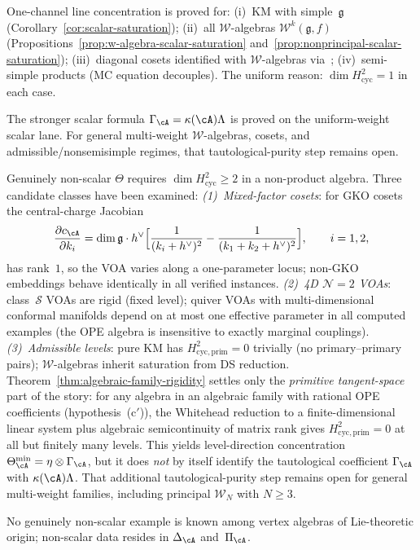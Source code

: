 \begin{remark}
\label{rem:scalar-saturation-scope}
One-channel line concentration is proved for:
(i)~KM with simple~$\mathfrak{g}$ (Corollary~\ref{cor:scalar-saturation});
(ii)~all $\mathcal{W}$-algebras $\mathcal{W}^k(\mathfrak{g},f)$
(Propositions~\ref{prop:w-algebra-scalar-saturation}
and~\ref{prop:nonprincipal-scalar-saturation});
(iii)~diagonal cosets identified with $\mathcal{W}$-algebras via~\cite{ACL19};
(iv)~semi-simple products (MC equation decouples).
The uniform reason: $\dim H^2_{\mathrm{cyc}} = 1$ in each case.

The stronger scalar formula
$\Gamma_{\cA} = \kappa(\cA)\Lambda$ is proved on the
uniform-weight scalar lane.  For general multi-weight
$\mathcal{W}$-algebras, cosets, and admissible/nonsemisimple
regimes, that tautological-purity step remains open.

Genuinely non-scalar $\Theta$ requires $\dim H^2_{\mathrm{cyc}} \geq 2$
in a non-product algebra.  Three candidate classes have been examined:
\emph{(1)~Mixed-factor cosets}: for GKO cosets the central-charge Jacobian
\[
\frac{\partial c_{\cA}}{\partial k_i}
= \dim\mathfrak{g} \cdot h^\vee
\Bigl[\frac{1}{(k_i + h^\vee)^2}
- \frac{1}{(k_1 + k_2 + h^\vee)^2}\Bigr],
\qquad i = 1, 2,
\]
has rank~$1$, so the VOA varies along a one-parameter locus;
non-GKO embeddings behave identically in all verified instances.
\emph{(2)~4D $\mathcal{N}=2$ VOAs}: class~$\mathcal{S}$ VOAs are rigid
(fixed level); quiver VOAs with multi-dimensional conformal manifolds
depend on at most one effective parameter in all computed examples
(the OPE algebra is insensitive to exactly marginal couplings).
\emph{(3)~Admissible levels}: pure KM has
$H^2_{\mathrm{cyc,prim}} = 0$ trivially (no primary--primary pairs);
$\mathcal{W}$-algebras inherit saturation from DS reduction.
Theorem~\ref{thm:algebraic-family-rigidity} settles only the
\emph{primitive tangent-space} part of the story: for any algebra in
an algebraic family with rational OPE coefficients
\textup{(}hypothesis~\textup{(c$'$)}\textup{)}, the Whitehead
reduction to a finite-dimensional linear system plus algebraic
semicontinuity of matrix rank gives
$H^2_{\mathrm{cyc,prim}} = 0$ at all but finitely many levels.
This yields level-direction concentration
$\Theta_{\cA}^{\min} = \eta \otimes \Gamma_{\cA}$, but it does
\emph{not} by itself identify the tautological coefficient
$\Gamma_{\cA}$ with $\kappa(\cA)\Lambda$.
That additional tautological-purity step remains open for
general multi-weight families, including principal
$\mathcal{W}_N$ with $N \geq 3$.

No genuinely non-scalar example is known among vertex algebras of
Lie-theoretic origin; non-scalar data resides in $\Delta_{\cA}$
and~$\Pi_{\cA}$.
\end{remark}


